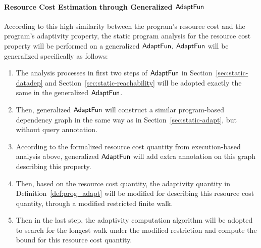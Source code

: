 \paragraph*{Resource Cost Estimation through Generalized $\textsf{AdaptFun}$}
According to this high similarity between the program's resource cost and the 
program's adaptivity property, the static program analysis for the resource cost property will 
be performed on a generalized  $\textsf{AdaptFun}$.  $\textsf{AdaptFun}$ will be generalized specifically as follows:
\begin{enumerate}
    \item The analysis processes in first two steps of $\textsf{AdaptFun}$ in Section~\ref{sec:static-datadep}
    and Section~\ref{sec:static-reachability} will be adopted exactly the same in the generalized $\textsf{AdaptFun}$.
    \item Then, generalized $\textsf{AdaptFun}$ will construct a similar program-based dependency graph 
    in the same way as in Section~\ref*{sec:static-adapt}, but without query annotation. 
    \item According to the formalized resource cost quantity from execution-based analysis above,
    generalized $\textsf{AdaptFun}$ will add extra annotation on this graph describing this property.
    \item Then, based on the resource cost quantity, the adaptivity quantity in Definition~\ref{def:prog_adapt}
    will be modified for describing this resource cost quantity, through a modified restricted finite walk.
    \item Then in the last step, the adaptivity computation algorithm will be adopted to search for the longest 
    walk under the modified restriction and compute the bound for 
    this resource cost quantity.
\end{enumerate}

% 

% 



